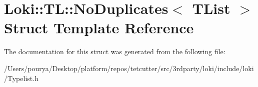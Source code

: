 \hypertarget{structLoki_1_1TL_1_1NoDuplicates}{}\section{Loki\+:\+:T\+L\+:\+:No\+Duplicates$<$ T\+List $>$ Struct Template Reference}
\label{structLoki_1_1TL_1_1NoDuplicates}


The documentation for this struct was generated from the following file\+:\begin{DoxyCompactItemize}
\item 
/\+Users/pourya/\+Desktop/platform/repos/tetcutter/src/3rdparty/loki/include/loki/Typelist.\+h\end{DoxyCompactItemize}
